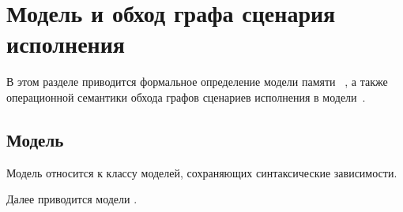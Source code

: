 \section{Модель \IMM и обход графа сценария исполнения}

В этом разделе приводится формальное 
определение модели памяти \IMM~\cite{Podkopaev-al:POPL19},
а также операционной семантики обхода графов 
сценариев исполнения в модели~\IMM.

\subsection*{Модель \IMM}

Модель \IMM относится к классу моделей, сохраняющих синтаксические зависимости. 
 





Далее приводится модели \IMM.

